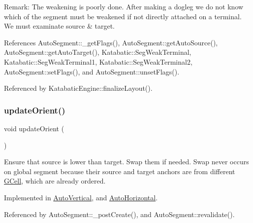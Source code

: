 \begin{DoxyParagraph}{Remark\+:}
The weakening is poorly done. After making a dogleg we do not know which of the segment must be weakened if not directly attached on a terminal. We must examinate source \& target. 
\end{DoxyParagraph}


References Auto\+Segment\+::\+\_\+get\+Flags(), Auto\+Segment\+::get\+Auto\+Source(), Auto\+Segment\+::get\+Auto\+Target(), Katabatic\+::\+Seg\+Weak\+Terminal, Katabatic\+::\+Seg\+Weak\+Terminal1, Katabatic\+::\+Seg\+Weak\+Terminal2, Auto\+Segment\+::set\+Flags(), and Auto\+Segment\+::unset\+Flags().



Referenced by Katabatic\+Engine\+::finalize\+Layout().

\mbox{\label{classKatabatic_1_1AutoSegment_a102e0f4bbb0386e41be214d15a9e4549}} 
\subsubsection{\texorpdfstring{update\+Orient()}{updateOrient()}}
{\footnotesize\ttfamily void update\+Orient (\begin{DoxyParamCaption}{ }\end{DoxyParamCaption})\hspace{0.3cm}{\ttfamily [pure virtual]}}

Ensure that source is lower than target. Swap them if needed. Swap never occurs on global segment because their source and target anchors are from different \hyperlink{classKatabatic_1_1GCell}{G\+Cell}, which are already ordered. 

Implemented in \hyperlink{classKatabatic_1_1AutoVertical_a59058f4593049c583c5b3698ff81b299}{Auto\+Vertical}, and \hyperlink{classKatabatic_1_1AutoHorizontal_a59058f4593049c583c5b3698ff81b299}{Auto\+Horizontal}.



Referenced by Auto\+Segment\+::\+\_\+post\+Create(), and Auto\+Segment\+::revalidate().

\mbox{\label{classKatabatic_1_1AutoSegment_a6d95f4de39c13611786c95ddc7b8942e}} 
